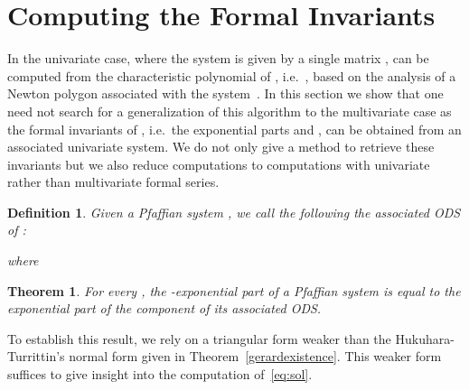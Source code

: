\documentclass[final,1p,times,number,amsthm]{elsart}
\newtheorem{theorem}[lemma]{Theorem}
\newtheorem{definition}[lemma]{Definition}
\begin{document}
\section{Computing the Formal Invariants}
\label{sec:invariants}
In the univariate case, where the system is given by a single matrix ,
 can be computed from the characteristic polynomial of , i.e.\
, based on the analysis of a Newton polygon associated
with the system~\cite[Theorem 1]{key24}. In this section we show that one need
not search for a generalization of this algorithm to the multivariate case as
the formal invariants of , i.e.\ the exponential parts and , can
be obtained from an associated univariate system. We do not only give a method
to retrieve these invariants but we also reduce computations to computations
with univariate rather than multivariate formal series.
\begin{definition}
\label{defass}
Given a Pfaffian system , we call the following the \textit{associated ODS}
of :
  
  where
  
\end{definition}
\begin{theorem}
\label{exponentialpfaff}
For every , the -exponential part of a
Pfaffian system is equal to the exponential part of the 
component of its associated ODS.
 \end{theorem}
 To establish this result, we rely on a triangular form weaker than the
 Hukuhara-Turrittin's normal form given in Theorem~\ref{gerardexistence}. This
 weaker form suffices to give insight into the computation of~\eqref{eq:sol}.
\end{document}
